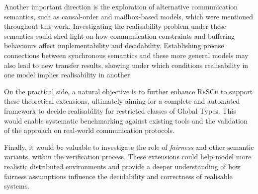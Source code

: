Another important direction is the exploration of alternative
communication semantics, such as causal-order and mailbox-based models,
which were mentioned throughout this work. Investigating the
realisability problem under these semantics could shed light on how
communication constraints and buffering behaviours affect implementability
and decidability. Establishing precise connections between synchronous
semantics and these more general models may also lead to new transfer
results, showing under which conditions realisability in one model
implies realisability in another.  

On the practical side, a natural objective is to further enhance
\textsc{ReSCu} to support these theoretical extensions, ultimately
aiming for a complete and automated framework to decide realisability
for restricted classes of Global Types. This would enable systematic
benchmarking against existing tools and the validation of the approach
on real-world communication protocols.  

Finally, it would be valuable to investigate the role of \emph{fairness}
and other semantic variants, within the verification process. 
These extensions could help
model more realistic distributed environments and provide a deeper
understanding of how fairness assumptions influence the decidability and
correctness of realisable systems.
